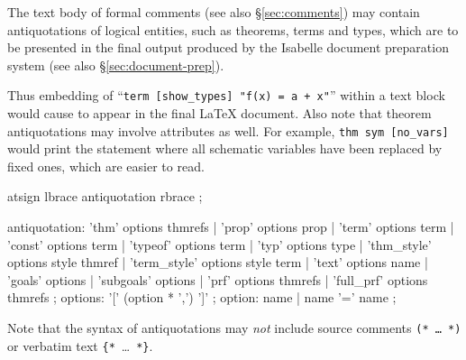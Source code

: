 The text body of formal comments (see also \S\ref{sec:comments}) may contain
antiquotations of logical entities, such as theorems, terms and types, which
are to be presented in the final output produced by the Isabelle document
preparation system (see also \S\ref{sec:document-prep}).

Thus embedding of
``\texttt{{\at}{\ttlbrace}term~[show_types]~"f(x)~=~a~+~x"{\ttrbrace}}''
within a text block would cause
to appear in the final {\LaTeX} document.  Also note that theorem
antiquotations may involve attributes as well.  For example,
\texttt{{\at}{\ttlbrace}thm~sym~[no_vars]{\ttrbrace}} would print the
statement where all schematic variables have been replaced by fixed ones,
which are easier to read.


\begin{rail}
  atsign lbrace antiquotation rbrace
  ;

  antiquotation:
    'thm' options thmrefs |
    'prop' options prop |
    'term' options term |
    'const' options term |
    'typeof' options term |
    'typ' options type |
    'thm\_style' options style thmref |
    'term\_style' options style term |
    'text' options name |
    'goals' options |
    'subgoals' options |
    'prf' options thmrefs |
    'full\_prf' options thmrefs
  ;
  options: '[' (option * ',') ']'
  ;
  option: name | name '=' name
  ;
\end{rail}

Note that the syntax of antiquotations may \emph{not} include source comments
\texttt{(*~\dots~*)} or verbatim text \verb|{*|~\dots~\verb|*}|.

